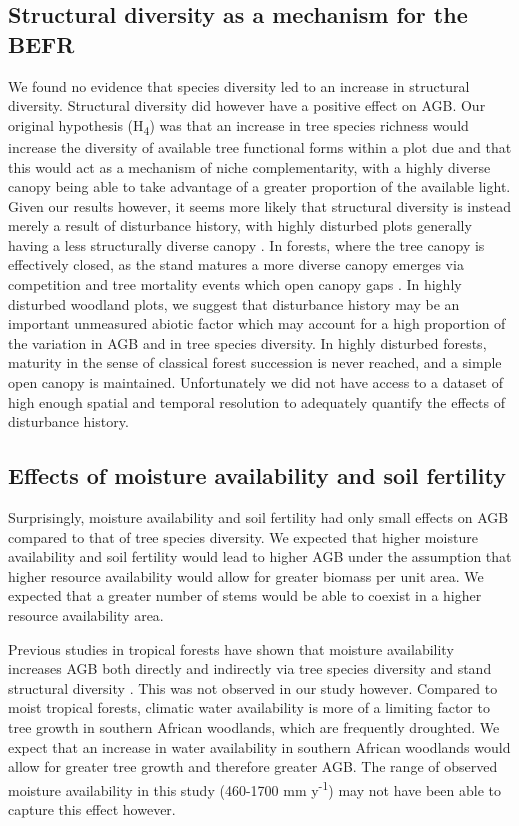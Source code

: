 \documentclass[11pt,a4paper]{article}
\begin{document}
\subsection{Structural diversity as a mechanism for the BEFR}

We found no evidence that species diversity led to an increase in structural diversity. Structural diversity did however have a positive effect on AGB. Our original hypothesis (H\textsubscript{4}) was that an increase in tree species richness would increase the diversity of available tree functional forms within a plot due and that this would act as a mechanism of niche complementarity, with a highly diverse canopy being able to take advantage of a greater proportion of the available light. Given our results however, it seems more likely that structural diversity is instead merely a result of disturbance history, with highly disturbed plots generally having a less structurally diverse canopy \citep{LaRue2019}. In forests, where the tree canopy is effectively closed, as the stand matures a more diverse canopy emerges via competition and tree mortality events which open canopy gaps \citep{Muscolo2014}. In highly disturbed woodland plots, we suggest that disturbance history may be an important unmeasured abiotic factor which may account for a high proportion of the variation in AGB and in tree species diversity. In highly disturbed forests, maturity in the sense of classical forest succession is never reached, and a simple open canopy is maintained. Unfortunately we did not have access to a dataset of high enough spatial and temporal resolution to adequately quantify the effects of disturbance history. 

\subsection{Effects of moisture availability and soil fertility}

Surprisingly, moisture availability and soil fertility had only small effects on AGB compared to that of tree species diversity. We expected that higher moisture availability and soil fertility would lead to higher AGB under the assumption that higher resource availability would allow for greater biomass per unit area. We expected that a greater number of stems would be able to coexist in a higher resource availability area.

Previous studies in tropical forests have shown that moisture availability increases AGB both directly and indirectly via tree species diversity and stand structural diversity \citep{Ali2019a, Ali2019b, Poorter2017}. This was not observed in our study however. Compared to moist tropical forests, climatic water availability is more of a limiting factor to tree growth in southern African woodlands, which are frequently droughted. We expect that an increase in water availability in southern African woodlands would allow for greater tree growth and therefore greater AGB. The range of observed moisture availability in this study (\textapprox{}460-1700 mm y\textsuperscript{-1}) may not have been able to capture this effect however.
\end{document}
